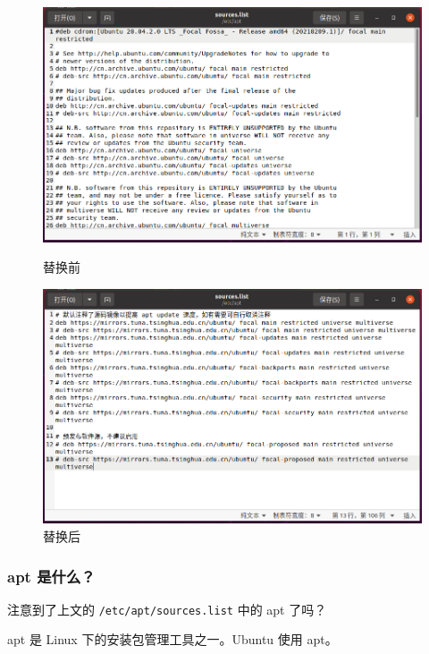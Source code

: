 \documentclass[UTF-8]{ctexart}
\begin{document}
				\begin{figure}[H]
					\centering
					\begin{minipage}{0.41\textwidth}
						\centering
						\includegraphics[width=\textwidth]{fig/sourceslist_before.png}
						\caption*{替换前}
					\end{minipage}
					\begin{minipage}{0.41\textwidth}
						\centering
						\includegraphics[width=\textwidth]{fig/sourceslist_after.png}
						\caption*{替换后}
					\end{minipage}
				\end{figure}
			
			\subsubsection{apt 是什么？}
			
				注意到了上文的 \texttt{/etc/apt/sources.list} 中的 apt 了吗？
	
				apt 是 Linux 下的安装包管理工具之一。Ubuntu 使用 apt。
				
\end{document}
